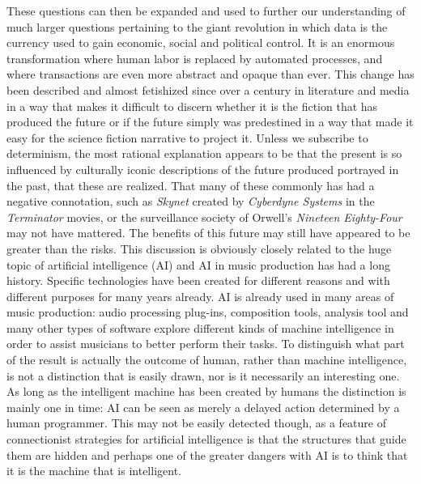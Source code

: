 \documentclass[11pt]{article}
\begin{document}
These questions can then be expanded and used to further our understanding of much larger questions pertaining to the giant revolution in which data is the currency used to gain economic, social and political control. It is an enormous transformation where human labor is replaced by automated processes, and where transactions are even more abstract and opaque than ever. This change has been described and almost fetishized since over a century in literature and media in a way that makes it difficult to discern whether it is the fiction that has produced the future or if the future simply was predestined in a way that made it easy for the science fiction narrative to project it. Unless we subscribe to determinism, the most rational explanation appears to be that the present is so influenced by culturally iconic descriptions of the future produced portrayed in the past, that these are realized. That many of these commonly has had a negative connotation, such as \emph{Skynet} created by \emph{Cyberdyne Systems} in the \emph{Terminator} movies, or the surveillance society of Orwell's \emph{Nineteen Eighty-Four} may not have mattered. The benefits of this future may still have appeared to be greater than the risks. This discussion is obviously closely related to the huge topic of artificial intelligence (AI) and AI in music production has had a long history. Specific technologies have been created for different reasons and with different purposes for many years already. AI is already used in many areas of music production: audio processing plug-ins, composition tools, analysis tool and many other types of software explore different kinds of machine intelligence in order to assist musicians to better perform their tasks. To distinguish what part of the result is actually the outcome of human, rather than machine intelligence, is not a distinction that is easily drawn, nor is it necessarily an interesting one. As long as the intelligent machine has been created by humans the distinction is mainly one in time: AI can be seen as merely a delayed action determined by a human programmer. This may not be easily detected though, as a feature of connectionist strategies for artificial intelligence is that the structures that guide them are hidden and perhaps one of the greater dangers with AI is to think that it is the machine that is intelligent.
\end{document}

